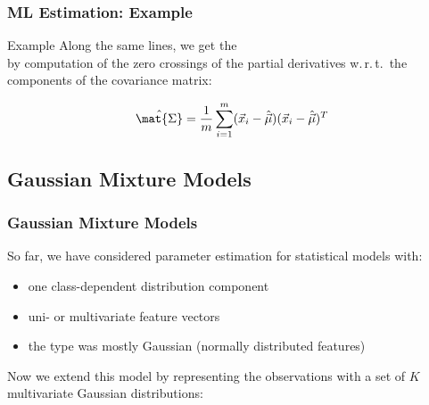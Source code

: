 \begin{frame}
  \frametitle{ML Estimation: Example \cont}

  \begin{ovalblock}{Example \cont}
    \small
    Along the same lines, we get the  \\
    by computation of the zero crossings of the partial derivatives w.\,r.\,t.\ the components of the covariance matrix:
 
    \begin{displaymath}
      \hat{\mat{\Sigma}} = \frac{1}{m} \sum_{i=1}^m (\vec x_i-\hat{\vec{\mu}})
                                                    (\vec x_i-\hat{\vec{\mu}})^T
    \end{displaymath}
  \end{ovalblock}
\end{frame}


\subsection{Gaussian Mixture Models}

\begin{frame}
  \frametitle{Gaussian Mixture Models}
  
  So far, we have considered parameter estimation for statistical models with: \pause

  \begin{itemize}
    \item one class-dependent distribution component \pause
    \item uni- or multivariate feature vectors \pause
    \item the type was mostly Gaussian (normally distributed features)
  \end{itemize}
  \pspread
  
  Now we extend this model by representing the observations with a set of $K$ multivariate Gaussian distributions:\\

  \begin{center}
  \end{center}
\end{frame}




